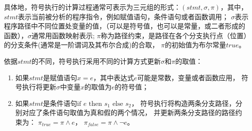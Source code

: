 
具体地，符号执行的计算过程通常可表示为三元组的形式：$(stmt, \sigma, \pi)$，其中，
$stmt$表示当前被分析的程序指令，例如赋值语句，条件语句或者函数调用；
$\sigma$表示程序路径中不同位置处变量的值，（可以是符号值，也可以是常量，或二者形成的函数），$\sigma$通常用函数映射表示;
$\pi$称为路径约束，是路径在各个分支执行点（位置）的分支条件(通常是一阶谓词及其布尔合成)的合取，
$\pi$的初始值为布尔常量$true$。

依据$stmt$的不同，符号执行采用不同的计算方式更新$\sigma$和$\pi$的取值：
\begin{enumerate}
\item 如果$stmt$是赋值语句$x = e$，其中表达式$e$可能是常数，变量或者函数应用，
	符号执行将更新$\sigma$中变量$x$的取值为$e$的符号值；
\item 如果$stmt$是条件语句$\text{if } e \text{ then } s_1 \text{ else } s_2$，
	符号执行将构造两条分支路径，分别对应了条件语句取值为真和假的两个情况，
	并更新两条分支路径的路径约束为： $\pi_{true} = \pi \wedge e$， 
	$\pi_{false} = \pi \wedge  \neg e$。
\end{enumerate}


